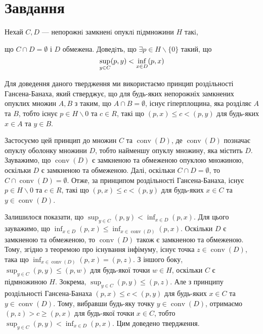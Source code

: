 
\chapter{Завдання \theHchapter}


\begin{tcolorbox}[title=Завдання]
    
    Нехай $C, D$ — непорожнi замкненi опуклi пiдмножини 
    $H$ такi, 
    
    
    що $ C \cap D = \emptyset$ і $D$ обмежена.
    Доведiть, що $ \exists p \in H \backslash \{0\} $
    такий, що
    $$ \displaystyle\sup_{y \in C} (p, y) < \displaystyle\inf_{x \in D} (p, x) $$

    
\end{tcolorbox}


Для доведення даного твердження ми використаємо принцип роздільності Гансена-Банаха, який стверджує, що для будь-яких непорожніх замкнених опуклих множин $A,B$ з таким, що $A \cap B = \emptyset$, існує гіперплощина, яка розділяє $A$ та $B$, тобто існує $p \in H \backslash {0}$ та $c \in R$, такі що $(p,x) \leq c < (p,y)$ для будь-яких $x \in A$ та $y \in B$.

Застосуємо цей принцип до множин $C$ та $\operatorname{conv}(D)$, де $\operatorname{conv}(D)$ позначає опуклу оболонку множини $D$, тобто найменшу опуклу множину, яка містить $D$. Зауважимо, що $\operatorname{conv}(D)$ є замкненою та обмеженою опуклою множиною, оскільки $D$ є замкненою та обмеженою. Далі, оскільки $C \cap D = \emptyset$, то $C \cap \operatorname{conv}(D) = \emptyset$. Отже, за принципом роздільності Гансена-Банаха, існує $p \in H \backslash {0}$ та $c \in R$, такі що $(p,x) \leq c < (p,y)$ для будь-яких $x \in C$ та $y \in \operatorname{conv}(D)$.

Залишилося показати, що $\sup_{y \in C} (p,y) < \inf_{x \in D} (p,x)$. Для цього зауважимо, що $\inf_{x \in D} (p,x) \leq \inf_{x \in \operatorname{conv}(D)} (p,x)$. Оскільки $D$ є замкненою та обмеженою, то $\operatorname{conv}(D)$ також є замкненою та обмеженою. Тому, згідно з теоремою про існування інфімуму, існує точка $z \in \operatorname{conv}(D)$, така що $\inf_{x \in \operatorname{conv}(D)} (p,x) = (p,z)$. З іншого боку, $\sup_{y \in C} (p,y) \leq (p,w)$ для будь-якої точки $w \in H$, оскільки $C$ є підмножиною $H$. Зокрема, $\sup_{y \in C} (p,y) \leq (p,z)$. Але з принципу роздільності Гансена-Банаха $(p,x) \leq c < (p,y)$ для будь-яких $x \in C$ та $y \in \operatorname{conv}(D)$. Тому, вибравши будь-яку точку $y \in \operatorname{conv}(D)$, отримаємо $(p,z) > c \geq (p,x)$ для будь-якої точки $x \in C$, тобто $\sup_{y \in C} (p,y) < \inf_{x \in D} (p,x)$. Цим доведено твердження.

